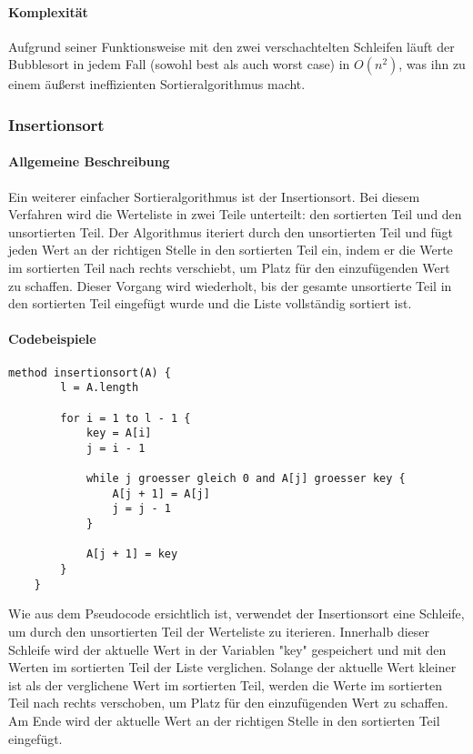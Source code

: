 \documentclass{article}
\begin{document}
	\paragraph{Komplexität}
	Aufgrund seiner Funktionsweise mit den zwei verschachtelten Schleifen läuft der Bubblesort in jedem Fall (sowohl best als auch worst case) in \textbf{$O(n^2)$}, was ihn zu einem äußerst ineffizienten Sortieralgorithmus macht.

	\subsubsection{Insertionsort}
	\paragraph{Allgemeine Beschreibung}
	Ein weiterer einfacher Sortieralgorithmus ist der Insertionsort. Bei diesem Verfahren wird die Werteliste in zwei Teile unterteilt: den sortierten Teil und den unsortierten Teil. Der Algorithmus iteriert durch den unsortierten Teil und fügt jeden Wert an der richtigen Stelle in den sortierten Teil ein, indem er die Werte im sortierten Teil nach rechts verschiebt, um Platz für den einzufügenden Wert zu schaffen. Dieser Vorgang wird wiederholt, bis der gesamte unsortierte Teil in den sortierten Teil eingefügt wurde und die Liste vollständig sortiert ist.

	\paragraph{Codebeispiele}
	\begin{lstlisting}[caption=Der Insertionsort-Algorithmus in einfachem Pseudocode]
	method insertionsort(A) {
		l = A.length

		for i = 1 to l - 1 {
			key = A[i]
			j = i - 1

			while j groesser gleich 0 and A[j] groesser key {
				A[j + 1] = A[j]
				j = j - 1
			}

			A[j + 1] = key
		}
	}
	\end{lstlisting}

	Wie aus dem Pseudocode ersichtlich ist, verwendet der Insertionsort eine Schleife, um durch den unsortierten Teil der Werteliste zu iterieren. Innerhalb dieser Schleife wird der aktuelle Wert in der Variablen "key" gespeichert und mit den Werten im sortierten Teil der Liste verglichen. Solange der aktuelle Wert kleiner ist als der verglichene Wert im sortierten Teil, werden die Werte im sortierten Teil nach rechts verschoben, um Platz für den einzufügenden Wert zu schaffen. Am Ende wird der aktuelle Wert an der richtigen Stelle in den sortierten Teil eingefügt.
\end{document}
